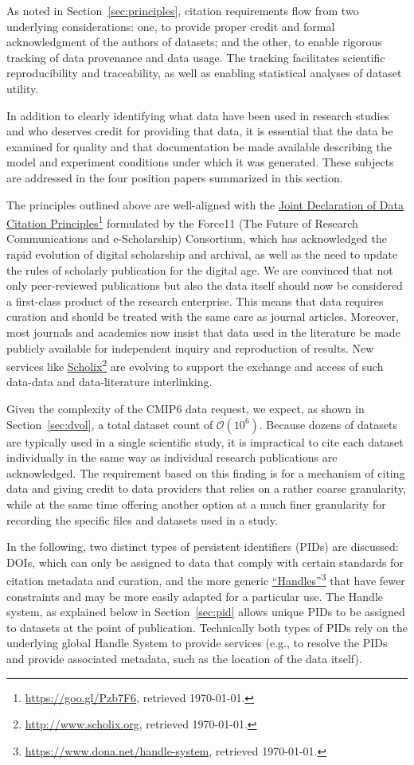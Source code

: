 \documentclass[gmd,manuscript]{copernicus}
\newcommand{\pllabel}[1]{\label{p-#1}\linelabel{l-#1}}
\newcommand{\urlref}[2] {\href{#1}{#2}\footnote{\url{#1}, retrieved \today.}}
\begin{document}
As noted in Section~\ref{sec:principles}, citation requirements flow
from two underlying considerations: one, to provide proper credit and
formal acknowledgment of the authors of datasets; and the other, to
enable rigorous tracking of data provenance and data usage. The
tracking facilitates scientific reproducibility and traceability, as
well as enabling statistical analyses of dataset utility.

In addition to clearly identifying what data have been used in
research studies and who deserves credit for providing that data, it
is essential that the data be examined for quality and that
documentation be made available describing the model and experiment
conditions under which it was generated. These subjects are addressed
in the four position papers summarized in this section.

The principles outlined above are well-aligned with the
\urlref{https://goo.gl/Pzb7F6}{Joint Declaration of Data Citation
Principles} formulated by the Force11 (The Future of Research
Communications and e-Scholarship) Consortium, which has acknowledged
the rapid evolution of digital scholarship and archival, as well as
the need to update the rules of scholarly publication for the digital
age. We are convinced that not only peer-reviewed publications but
also the data itself should now be considered a first-class product of
the research enterprise. This means that data requires curation and
should be treated with the same care as journal articles. Moreover,
most journals and academies now insist that data used in the
literature be made publicly available for independent inquiry and
reproduction of results. New services like
\urlref{http://www.scholix.org}{Scholix} are evolving to support the
exchange and access of such data-data and data-literature
interlinking.

Given the complexity of the CMIP6 data request, we expect, as shown in
Section~\ref{sec:dvol}, a total dataset count of $\mathcal{O}(10^6)$.
Because dozens of datasets are typically used in a single scientific
study, it is impractical to cite each dataset individually in the same
way as individual research publications are acknowledged. The
requirement based on this finding is for a mechanism of citing data
and giving credit to data providers that relies on a rather coarse
granularity, while at the same time offering another option at a much
finer granularity for recording the specific files and datasets used
in a study.

In the following, two distinct types of persistent identifiers (PIDs)
are discussed: DOIs, which can only be assigned to data that comply
with certain standards for citation metadata and curation, and the
more generic
\pllabel{RC1-37}
\urlref{https://www.dona.net/handle-system}{``Handles''} that have
fewer constraints and may be more easily adapted for a particular use.
\pllabel{RC2-31}
The Handle system, as explained below in Section~\ref{sec:pid} allows
unique PIDs to be assigned to datasets at the point of publication.
Technically both types of PIDs rely on the underlying global Handle
System to provide services (e.g., to resolve the PIDs and provide
associated metadata, such as the location of the data itself).
\end{document}
